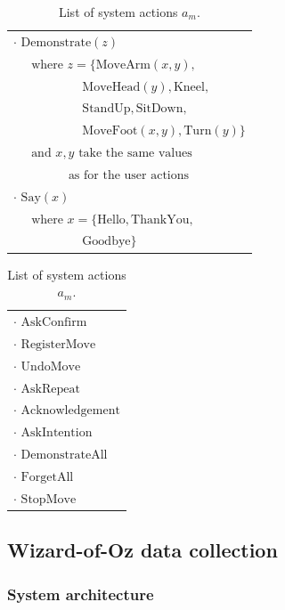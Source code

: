 \begin{table}[ht]
\begin{footnotesize}
\begin{tabular}{p{60mm}} 
$\cdot$ $\mathrm{Demonstrate}(z)$ \\ $\ \ \ \ \ \text { where } z = \{\mathrm{MoveArm}(x,y), $ \\ $\ \ \ \ \ \ \ \ \ \ \ \ \ \ \ \ \ \ \ \ \ \ \ \ \  \mathrm{MoveHead}(y),\mathrm{Kneel}, $ \\ $\ \ \ \ \ \ \ \ \ \ \ \ \ \ \ \ \ \ \ \ \ \ \ \ \  \mathrm{StandUp},\mathrm{SitDown}, $ \\ $\ \ \ \ \ \ \ \ \ \ \ \ \ \ \ \ \ \ \ \ \ \ \ \ \  \mathrm{MoveFoot}(x,y), \mathrm{Turn}(y)\}$ \\ $\ \ \ \ \ \text{ and } x, y \text{ take the same values}$ \\ $\ \ \ \ \ \ \ \ \ \ \ \ \ \ \ \ \ \ \ \ \text{as for the user actions}$ \\
$\cdot$ $\mathrm{Say}(x)$ \\  $ \ \ \ \ \  \text{ where } x = \{\mathrm{Hello, ThankYou,}$ \\ $\ \ \ \ \ \ \ \ \ \ \ \ \ \ \ \ \ \ \ \ \ \ \ \ \  \mathrm{Goodbye}\}$
\end{tabular}
\hspace{2cm}
\begin{tabular}{p{60mm}} 
$\cdot$ $\mathrm{AskConfirm}$ \\
$\cdot$ $\mathrm{RegisterMove}$ \\
$\cdot$ $\mathrm{UndoMove}$ \\
$\cdot$ $\mathrm{AskRepeat}$ \\
$\cdot$ $\mathrm{Acknowledgement}$ \\
$\cdot$ $\mathrm{AskIntention}$ \\
$\cdot$ $\mathrm{DemonstrateAll}$ \\
$\cdot$ $\mathrm{ForgetAll}$ \\
$\cdot$ $\mathrm{StopMove}$
\end{tabular}
\end{footnotesize}
\caption{List of system actions $a_m$.} 
\label{table:systemdas}
\end{table}

\subsection{Wizard-of-Oz data collection}
\label{sec:wozlearning-experiments-woz}

\subsubsection*{System architecture}


